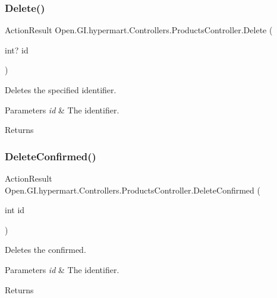 \subsubsection{\texorpdfstring{Delete()}{Delete()}}
{\footnotesize\ttfamily Action\+Result Open.\+G\+I.\+hypermart.\+Controllers.\+Products\+Controller.\+Delete (\begin{DoxyParamCaption}\item[{int?}]{id }\end{DoxyParamCaption})}



Deletes the specified identifier. 


\begin{DoxyParams}{Parameters}
{\em id} & The identifier.\\
\hline
\end{DoxyParams}
\begin{DoxyReturn}{Returns}

\end{DoxyReturn}
\hypertarget{class_open_1_1_g_i_1_1hypermart_1_1_controllers_1_1_products_controller_a043d74a7640e6cd249143de4c9641404}{}\label{class_open_1_1_g_i_1_1hypermart_1_1_controllers_1_1_products_controller_a043d74a7640e6cd249143de4c9641404} 
\subsubsection{\texorpdfstring{Delete\+Confirmed()}{DeleteConfirmed()}}
{\footnotesize\ttfamily Action\+Result Open.\+G\+I.\+hypermart.\+Controllers.\+Products\+Controller.\+Delete\+Confirmed (\begin{DoxyParamCaption}\item[{int}]{id }\end{DoxyParamCaption})}



Deletes the confirmed. 


\begin{DoxyParams}{Parameters}
{\em id} & The identifier.\\
\hline
\end{DoxyParams}
\begin{DoxyReturn}{Returns}

\end{DoxyReturn}
\hypertarget{class_open_1_1_g_i_1_1hypermart_1_1_controllers_1_1_products_controller_a12f3659f36389715ec436c6a90bc0dc7}{}\label{class_open_1_1_g_i_1_1hypermart_1_1_controllers_1_1_products_controller_a12f3659f36389715ec436c6a90bc0dc7} 
